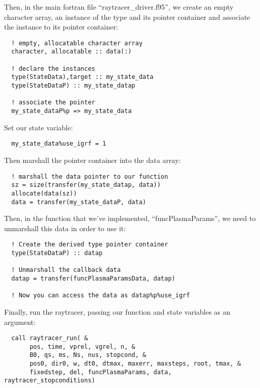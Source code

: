 \documentclass[10pt]{article}
\begin{document}
Then, in the main fortran file ``raytracer\_driver.f95'', we create an
empty character array, an instance of the type and its pointer
container and associate the instance to its pointer container:
\begin{verbatim}
  ! empty, allocatable character array
  character, allocatable :: data(:)

  ! declare the instances
  type(StateData),target :: my_state_data
  type(StateDataP) :: my_state_datap
  
  ! associate the pointer
  my_state_dataP%p => my_state_data
\end{verbatim}

Set our state variable:
\begin{verbatim}
  my_state_data%use_igrf = 1
\end{verbatim}

Then marshall the pointer container into the data array:
\begin{verbatim}
  ! marshall the data pointer to our function
  sz = size(transfer(my_state_datap, data))
  allocate(data(sz))
  data = transfer(my_state_dataP, data)
\end{verbatim}

Then, in the function that we've implemented, ``funcPlasmaParams'', we
need to unmarshall this data in order to use it:

\begin{verbatim}
  ! Create the derived type pointer container
  type(StateDataP) :: datap

  ! Unmarshall the callback data
  datap = transfer(funcPlasmaParamsData, datap)

  ! Now you can access the data as datap%p%use_igrf
\end{verbatim}

Finally, run the raytracer, passing our function and state variables
as an argument:
\begin{verbatim}
  call raytracer_run( &
       pos, time, vprel, vgrel, n, &
       B0, qs, ms, Ns, nus, stopcond, &
       pos0, dir0, w, dt0, dtmax, maxerr, maxsteps, root, tmax, &
       fixedstep, del, funcPlasmaParams, data, raytracer_stopconditions)
\end{verbatim}
\end{document}
